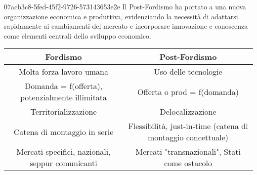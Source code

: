 \documentclass[preview]{standalone}
\begin{document}
\begin{snippet}{07acb3c8-5fed-45f2-9726-573143653e2e}
    Il Post-Fordismo ha portato a una nuova organizzazione economica e produttiva, evidenziando la necessità di adattarsi rapidamente ai cambiamenti del mercato e incorporare innovazione e conoscenza come elementi centrali dello sviluppo economico.

    \begin{table}[h]
        \centering
        \begin{tabular}{|c|c|}
        \hline
        \textbf{Fordismo} & \textbf{Post-Fordismo} \\ \hline
        Molta forza lavoro umana & Uso delle tecnologie \\ \hline
        Domanda = f(offerta), potenzialmente illimitata & Offerta o prod = f(domanda) \\ \hline
        Territorializzazione & Delocalizzazione \\\hline
        Catena di montaggio in serie & Flessibilità, just-in-time (catena di montaggio concettuale) \\\hline
        Mercati specifici, nazionali, seppur comunicanti & Mercati "transnazionali", Stati come ostacolo \\ \hline
        \end{tabular}
    \end{table}
\end{snippet}
\end{document}
